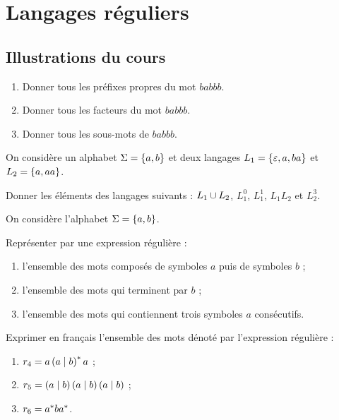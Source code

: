 \chapter{Langages réguliers}

\minitoc

\section*{Illustrations du cours}

\begin{exo}
\begin{enumerate}
    \item Donner tous les préfixes propres du mot \(babbb\). \\
    \item Donner tous les facteurs du mot \(babbb\). \\
    \item Donner tous les sous-mots de \(babbb\).
\end{enumerate}
\end{exo}

\begin{exo}
On considère un alphabet \(\Sigma=\left\lbrace a,b\right\rbrace\) et deux langages \(L_1=\left\lbrace\varepsilon,a,ba\right\rbrace\) et \(L_2=\left\lbrace a,aa\right\rbrace\).

Donner les éléments des langages suivants : \(L_1\cup L_2\), \(L_1^0\), \(L_1^1\), \(L_1L_2\) et \(L_2^3\).
\end{exo}

\begin{exo}
On considère l'alphabet \(\Sigma=\left\lbrace a,b\right\rbrace\).

Représenter par une expression régulière :

\begin{enumerate}[series=ex1.3]
    \item l'ensemble des mots composés de symboles \(a\) puis de symboles \(b\) ; \\
    \item l'ensemble des mots qui terminent par \(b\) ; \\
    \item l'ensemble des mots qui contiennent trois symboles \(a\) consécutifs.
\end{enumerate}

Exprimer en français l'ensemble des mots dénoté par l'expression régulière :

\begin{enumerate}[resume=ex1.3]
    \item \(r_4=a\left(a\mid b\right)^{*} a\) ; \\
    \item \(r_5=\left(a\mid b\right)\left(a\mid b\right)\left(a\mid b\right)\) ; \\
    \item \(r_6=a^{*} ba^{*}\).
\end{enumerate}
\end{exo}

